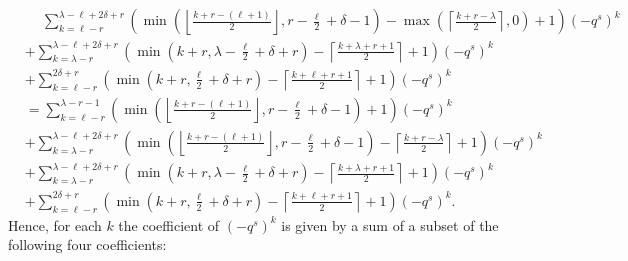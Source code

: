 \begin{align*}
  &\phantom+ \sum_{k=\ell-r}^{\lambda-\ell+2\delta+r} \left(
    \min\left( \left\lfloor \frac{k + r - (\ell + 1)}{2} \right\rfloor, r - \frac{\ell}{2} + \delta - 1 \right)
    - \max\left( \left\lceil \frac{k + r -\lambda}{2} \right\rceil, 0 \right) + 1 \right) (-q^s)^k \\
  &+ \sum_{k=\lambda-r}^{\lambda-\ell+2\delta+r} \left(
    \min\left(k+r, \lambda - \frac{\ell}{2} + \delta + r \right)
    - \left\lceil \frac{k+\lambda+r+1}{2} \right\rceil + 1 \right) (-q^s)^k \\
  &+ \sum_{k=\ell-r}^{2\delta+r} \left(
    \min\left( k+r, \frac{\ell}{2} + \delta + r \right)
    - \left\lceil \frac{k+\ell+r+1}{2} \right\rceil + 1 \right) (-q^s)^k \\
  &= \sum_{k=\ell-r}^{\lambda-r-1} \left(
    \min\left( \left\lfloor \frac{k + r - (\ell + 1)}{2} \right\rfloor, r - \frac{\ell}{2} + \delta - 1 \right)
    + 1 \right) (-q^s)^k \\
  &+ \sum_{k=\lambda-r}^{\lambda-\ell+2\delta+r} \left(
    \min\left( \left\lfloor \frac{k + r - (\ell + 1)}{2} \right\rfloor, r - \frac{\ell}{2} + \delta - 1 \right)
    - \left\lceil \frac{k + r -\lambda}{2} \right\rceil + 1 \right) (-q^s)^k \\
  &+ \sum_{k=\lambda-r}^{\lambda-\ell+2\delta+r} \left(
    \min\left(k+r, \lambda - \frac{\ell}{2} + \delta + r \right)
    - \left\lceil \frac{k+\lambda+r+1}{2} \right\rceil + 1 \right) (-q^s)^k \\
  &+ \sum_{k=\ell-r}^{2\delta+r} \left(
    \min\left( k+r, \frac{\ell}{2} + \delta + r \right)
    - \left\lceil \frac{k+\ell+r+1}{2} \right\rceil + 1 \right)(-q^s)^k .
\end{align*}
Hence, for each $k$ the coefficient of $(-q^s)^k$
is given by a sum of a subset of the following four coefficients:
